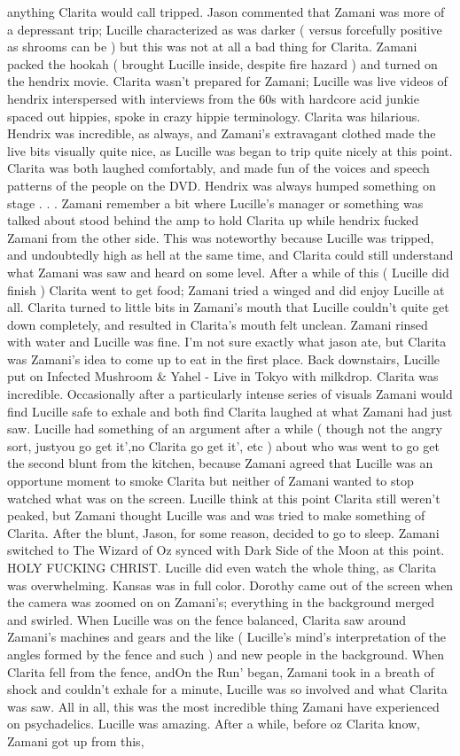 \documentclass[12pt]{book}
\begin{document}
anything Clarita would call tripped. Jason commented that Zamani was more of a depressant trip; Lucille characterized as was darker ( versus forcefully positive as shrooms can be ) but this was not at all a bad thing for Clarita. Zamani packed the hookah ( brought Lucille inside, despite fire hazard ) and turned on the hendrix movie. Clarita wasn't prepared for Zamani; Lucille was live videos of hendrix interspersed with interviews from the 60s with hardcore acid junkie spaced out hippies, spoke in crazy hippie terminology. Clarita was hilarious. Hendrix was incredible, as always, and Zamani's extravagant clothed made the live bits visually quite nice, as Lucille was began to trip quite nicely at this point. Clarita was both laughed comfortably, and made fun of the voices and speech patterns of the people on the DVD. Hendrix was always humped something on stage . . .  Zamani remember a bit where Lucille's manager or something was talked about stood behind the amp to hold Clarita up while hendrix fucked Zamani from the other side. This was noteworthy because Lucille was tripped, and undoubtedly high as hell at the same time, and Clarita could still understand what Zamani was saw and heard on some level. After a while of this ( Lucille did finish ) Clarita went to get food; Zamani tried a winged and did enjoy Lucille at all. Clarita turned to little bits in Zamani's mouth that Lucille couldn't quite get down completely, and resulted in Clarita's mouth felt unclean. Zamani rinsed with water and Lucille was fine. I'm not sure exactly what jason ate, but Clarita was Zamani's idea to come up to eat in the first place. Back downstairs, Lucille put on Infected Mushroom \& Yahel - Live in Tokyo with milkdrop. Clarita was incredible. Occasionally after a particularly intense series of visuals Zamani would find Lucille safe to exhale and both find Clarita laughed at what Zamani had just saw. Lucille had something of an argument after a while ( though not the angry sort, justyou go get it',no Clarita go get it', etc ) about who was went to go get the second blunt from the kitchen, because Zamani agreed that Lucille was an opportune moment to smoke Clarita but neither of Zamani wanted to stop watched what was on the screen. Lucille think at this point Clarita still weren't peaked, but Zamani thought Lucille was and was tried to make something of Clarita. After the blunt, Jason, for some reason, decided to go to sleep. Zamani switched to The Wizard of Oz synced with Dark Side of the Moon at this point. HOLY FUCKING CHRIST. Lucille did even watch the whole thing, as Clarita was overwhelming. Kansas was in full color. Dorothy came out of the screen when the camera was zoomed on on Zamani's; everything in the background merged and swirled. When Lucille was on the fence balanced, Clarita saw around Zamani's machines and gears and the like ( Lucille's mind's interpretation of the angles formed by the fence and such ) and new people in the background. When Clarita fell from the fence, andOn the Run' began, Zamani took in a breath of shock and couldn't exhale for a minute, Lucille was so involved and what Clarita was saw. All in all, this was the most incredible thing Zamani have experienced on psychadelics. Lucille was amazing. After a while, before oz Clarita know, Zamani got up from this, 
\end{document}
